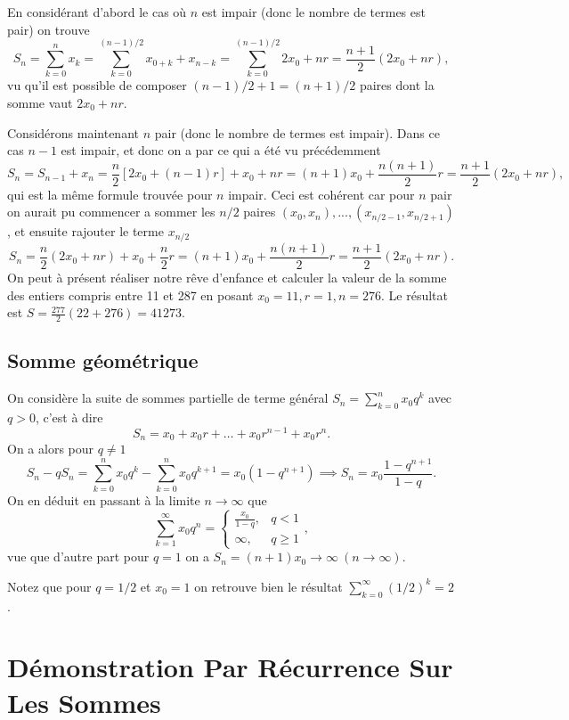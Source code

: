 \documentclass[oneside,11pt,french,table]{book}
\theoremstyle{definition}
\theoremstyle{plain}
\theoremstyle{remark}
\begin{document}
        En considérant d'abord le cas où $n$ est impair (donc le nombre de termes est pair) on trouve  
        \[
            S_n=\sum_{k=0}^{n}x_k=\sum_{k=0}^{(n-1)/2}x_{0+k}+x_{n-k}=\sum_{k=0}^{(n-1)/2}2x_0+nr=\frac{n+1}{2}(2x_0+nr),
        \]
        vu qu'il est possible de composer $(n-1)/2+1=(n+1)/2$ paires dont la somme vaut $2x_0+nr$.
        
        Considérons maintenant $n$ pair (donc le nombre de termes est impair). Dans ce cas $n-1$ est impair, et donc on a par ce qui a été vu précédemment 
        \[
            S_n=S_{n-1}+x_n=\frac{n}{2}[2x_0+(n-1)r] + x_0+nr=(n+1)x_0+\frac{n(n+1)}{2}r=\frac{n+1}{2}(2x_0+nr),
        \]
        qui est la même formule trouvée pour $n$ impair. Ceci est cohérent car pour $n$ pair on aurait pu commencer a sommer les $n/2$ paires $(x_0,x_n), ..., (x_{n/2-1},x_{n/2+1})$, et ensuite rajouter le terme $x_{n/2}$
        \[
            S_n=\frac{n}{2}(2x_0+nr) + x_0+\frac{n}{2}r=(n+1)x_0+\frac{n(n+1)}{2}r=\frac{n+1}{2}(2x_0+nr).
        \]
        On peut à présent réaliser notre rêve d'enfance et calculer la valeur de la somme des entiers compris entre 11 et 287 en posant $x_0=11,r=1,n=276$. Le résultat est $S=\frac{277}{2}(22+276)=41273$.
    \subsection{Somme géométrique}
        On considère la suite de sommes partielle de terme général $S_n=\sum_{k=0}^{n}x_0q^k$ avec $q>0$, c'est à dire
        \[
            S_n=x_0 + x_0r + \dots + x_0r^{n-1}+ x_0r^n.
        \]
        On a alors pour $q\ne 1$
        \[
            S_n - qS_n = \sum_{k=0}^{n}x_0q^k - \sum_{k=0}^{n}x_0q^{k+1} = x_0(1-q^{n+1})\implies S_n=x_0\frac{1-q^{n+1}}{1-q}.
        \]
        On en déduit en passant à la limite $n\to\infty$ que
        \[
            \sum_{k=1}^{\infty}x_0q^n = \begin{cases}\displaystyle  \frac{x_0}{1-q}, & q<1 \\
                \infty, & q\ge 1
                \end{cases},
        \]
        vue que d'autre part pour $q=1$ on a $S_n=(n+1)x_0\to\infty\ (n\to\infty)$.
        
        Notez que pour $q=1/2$ et $x_0=1$ on retrouve bien le résultat $\sum_{k=0}^{\infty}(1/2)^k=2$.
\section{Démonstration Par Récurrence Sur Les Sommes}
\end{document}
